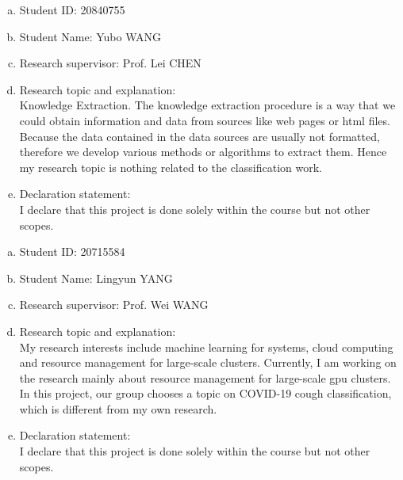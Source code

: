 \documentclass[11pt]{article}
\begin{document}
\begin{member}
	\begin{enumerate}[(a)]
		\item Student ID: 20840755
		\item Student Name: Yubo WANG
		\item Research supervisor: Prof. Lei CHEN
		\item Research topic and explanation: \\
		Knowledge Extraction. The knowledge extraction procedure is a way that we could obtain information and data from sources like web pages or html files. Because the data contained in the data sources are usually not formatted, therefore we develop various methods or algorithms to extract them. Hence my research topic is nothing related to the classification work.
		\item Declaration statement: \\
		I declare that this project is done solely within the course but not other scopes.
	\end{enumerate}
\end{member}

\begin{member}
	\begin{enumerate}[(a)]
		\item Student ID: 20715584
		\item Student Name: Lingyun YANG
		\item Research supervisor: Prof. Wei WANG
		\item Research topic and explanation: \\
		My research interests include machine learning for systems, cloud computing and resource management for large-scale clusters. Currently, I am working on the research mainly about resource management for large-scale gpu clusters. In this project, our group chooses a topic on COVID-19 cough classification, which is different from my own research.
		\item Declaration statement: \\
		I declare that this project is done solely within the course but not other scopes.

	\end{enumerate}
\end{member}

\end{document}
